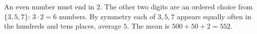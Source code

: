 An even number must end in $2$. The other two digits are an ordered choice from $\{3,5,7\}$: $3\cdot2=6$ numbers. By symmetry each of $3,5,7$ appears equally often in the hundreds and tens places, average $5$. The mean is $500+50+2=\boxed{552}$.
